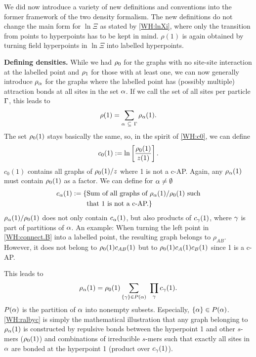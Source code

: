 \documentclass[8.5pt,twoside,twocolumn]{article}
\newcommand\roz{\enmat{\rho_0}}
\newcommand\rone{\enmat{\rho_1}}
\newcommand\ral{\enmat{\rho_{\al}}}
\newcommand\cga{\enmat{c_{\ga}}}
\theoremstyle{standard}
\begin{document}
We did now introduce a variety of new definitions and conventions into the former framework of
the two density formalism. The new definitions do not change the main form for $\ln\Xi$ as stated
by \eqref{WH:lnXi}, where only the transition from points to hyperpoints has to be kept
in mind. $\rho(1)$ is again obtained by turning field hyperpoints in $\ln\Xi$ into labelled 
hyperpoints.

\textbf{Defining densities.} While we had $\roz$ for the graphs with no site-site
interaction at the labelled point and $\rone$ for those with at least one, we can now
generally introduce $\ral$ for the graphs where the labelled point has (possibly multiple)
attraction bonds at all sites in the set $\alpha$. If we call the set of all sites per particle
$\Gamma$, this leads to
\begin{equation}
\rho(1)=\sum_{\al\ \suseq\ \Ga} \ral(1).
\label{WH:multdens}
\end{equation}
The set $\roz(1)$ stays basically the same, so, in the spirit of \eqref{WH:c0}, we can define
\begin{equation}
c_0(1):=\ln\lt[\frac{\roz(1)}{z(1)}\rt].
\label{WH:c0.repeat}
\end{equation}
$c_0(1)$ contains all graphs of $\roz(1)/z$ where 1 is not a c-AP. Again, any $\ral(1)$ must
contain $\roz(1)$ as a factor. We can define for $\alpha\neq\emptyset$
\begin{equation}
\begin{aligned}
c_\al(1):=\{&\te{Sum of all graphs of } {\ral(1)}/{\roz(1)} \te{ such} \\
&\te{that 1 is not a c-AP.}\}
\end{aligned}
\label{WH:cal}
\end{equation}
$\ral(1)/\roz(1)$ does not only contain $c_{\alpha}(1)$, but also products of $c_{\gamma}(1)$, where
$\gamma$ is part of partitions of $\alpha$. An example: When turning the left point in 
\eqref{WH:connect.B} into a labelled point, the resulting graph belongs to $\rho_{AB}$.
However, it does not belong to $\roz(1)c_{AB}(1)$ but to $\roz(1)c_A(1)c_B(1)$ since
1 is a c-AP.

This leads to
\newcommand\inp{\enmat{\in}}
\begin{equation}
\ral(1)=\roz(1)\sum_{\st{\ga} \inp P(\al)}\ \prod_{\ga} \cga(1).
\label{WH:ralbyc}
\end{equation}
$P(\alpha)$ is the partition of $\alpha$ into nonempty subsets. Especially, $\left\{{\alpha} \right\} \in P(\alpha)$.
\eqref{WH:ralbyc} is simply the mathematical illustration that any graph belonging
to $\ral(1)$ is constructed by repulsive bonds between the hyperpoint 1 and other $s$-mers
($\roz(1)$) and combinations of irreducible $s$-mers such that exactly all sites in
$\alpha$ are bonded at the hyperpoint 1 (product over $\cga(1)$).
\end{document}
